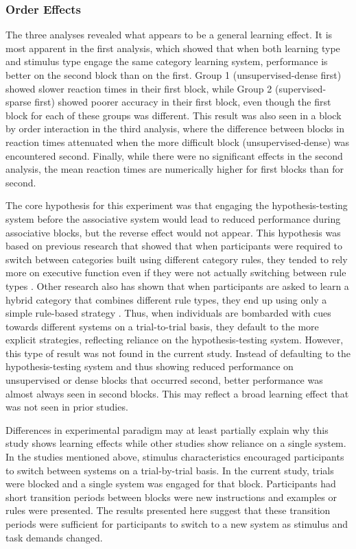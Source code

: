 \documentclass[../dissertation.tex]{subfiles}
\begin{document}
\subsubsection{Order Effects}
	The three analyses revealed what appears to be a general learning effect. It is most apparent in the first analysis, which showed that when both learning type and stimulus type engage the same category learning system, performance is better on the second block than on the first. Group 1 (unsupervised-dense first) showed slower reaction times in their first block, while Group 2 (supervised-sparse first) showed poorer accuracy in their first block, even though the first block for each of these groups was different. This result was also seen in a block by order interaction in the third analysis, where the difference between blocks in reaction times attenuated when the more difficult block (unsupervised-dense) was encountered second. Finally, while there were no significant effects in the second analysis, the mean reaction times are numerically higher for first blocks than for second. \par
	The core hypothesis for this experiment was that engaging the hypothesis-testing system before the associative system would lead to reduced performance during associative blocks, but the reverse effect would not appear. This hypothesis was based on previous research that showed that when participants were required to switch between categories built using different category rules, they tended to rely more on executive function even if they were not actually switching between rule types \citep{Erickson2008}. Other research also has shown that when participants are asked to learn a hybrid category that combines different rule types, they end up using only a simple rule-based strategy \citep{Ashby2010}. Thus, when individuals are bombarded with cues towards different systems on a trial-to-trial basis, they default to the more explicit strategies, reflecting reliance on the hypothesis-testing system. However, this type of result was not found in the current study. Instead of defaulting to the hypothesis-testing system and thus showing reduced performance on unsupervised or dense blocks that occurred second, better performance was almost always seen in second blocks. This may reflect a broad learning effect that was not seen in prior studies. \par
	Differences in experimental paradigm may at least partially explain why this study shows learning effects while other studies show reliance on a single system. In the studies mentioned above, stimulus characteristics encouraged participants to switch between systems on a trial-by-trial basis. In the current study, trials were blocked and a single system was engaged for that block. Participants had short transition periods between blocks were new instructions and examples or rules were presented. The results presented here suggest that these transition periods were sufficient for participants to switch to a new system as stimulus and task demands changed. 
	
\end{document}
